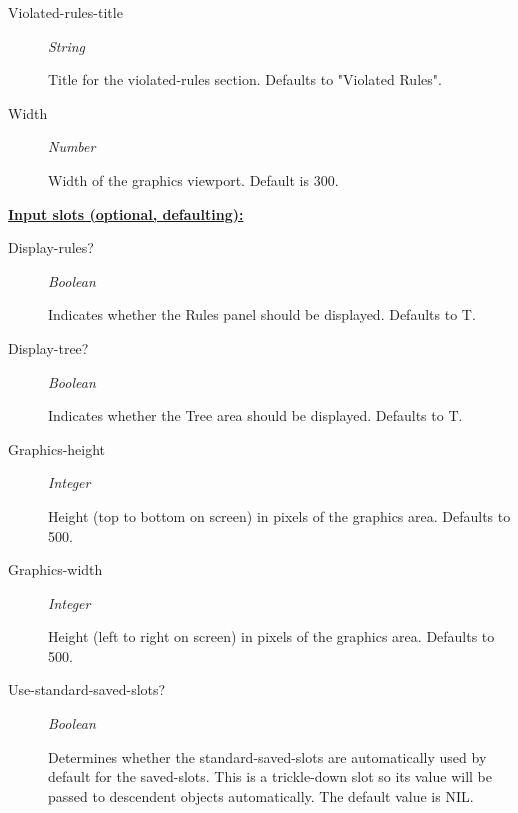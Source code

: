 \documentclass [11pt]{book}
\begin{document}
\begin{itemize}
\begin{description}
\item [Violated-rules-title]
\emph{String}

 Title for the violated-rules section. Defaults to "Violated Rules".




\item [Width]
\emph{Number}

 Width of the graphics viewport. Default is 300.




\end{description}






\textbf{
\underline{Input slots (optional, defaulting):}}

\begin{description}

\item [Display-rules?]
\emph{Boolean}

 Indicates whether the Rules panel should be displayed. Defaults to T.




\item [Display-tree?]
\emph{Boolean}

 Indicates whether the Tree area should be displayed. Defaults to T.




\item [Graphics-height]
\emph{Integer}

 Height (top to bottom on screen) in pixels of the graphics area. Defaults to 500.




\item [Graphics-width]
\emph{Integer}

 Height (left to right on screen) in pixels of the graphics area. Defaults to 500.




\item [Use-standard-saved-slots?]
\emph{Boolean}

 Determines whether the standard-saved-slots are automatically used by default for the
saved-slots. This is a trickle-down slot so its value will be passed to descendent objects automatically.
The default value is NIL.





\end{description}
\end{itemize}
\end{document}
